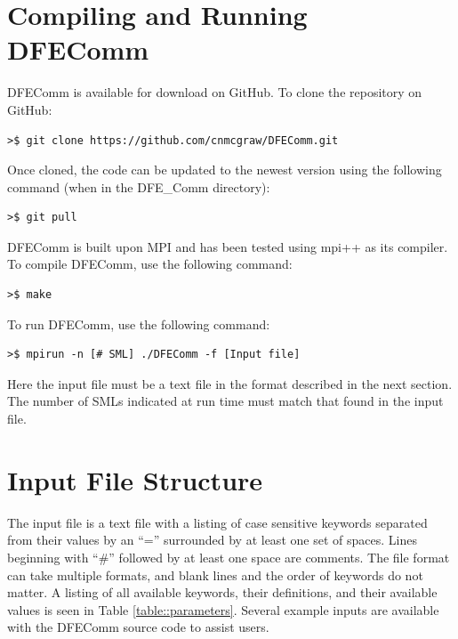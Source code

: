 \documentclass{article}
\begin{document}
\section{Compiling and Running DFEComm}
DFEComm is available for download on GitHub. To clone the repository on GitHub:
\begin{verbatim}
>$ git clone https://github.com/cnmcgraw/DFEComm.git
\end{verbatim}
Once cloned, the code can be updated to the newest version using the following command (when in the DFE\_Comm directory):
\begin{verbatim}
>$ git pull
\end{verbatim}
 DFEComm is built upon MPI and has been tested using mpi++ as its compiler. To compile DFEComm, use the following command:
\begin{verbatim}
>$ make
\end{verbatim}
To run DFEComm, use the following command:
\begin{verbatim}
>$ mpirun -n [# SML] ./DFEComm -f [Input file]
\end{verbatim}
Here the input file must be a text file in the format described in the next section. The number of SMLs indicated at run time must match that found in the input file.

\section{Input File Structure}
The input file is a text file with a listing of case sensitive keywords separated from their values by an ``='' surrounded by at least one set of spaces. Lines beginning with ``\#'' followed by at least one space are comments. The file format can take multiple formats, and blank lines and the order of keywords do not matter. A listing of all available keywords, their definitions, and their available values is seen in Table \ref{table::parameters}.  Several example inputs are available with the DFEComm source code to assist users. \\
\end{document}
